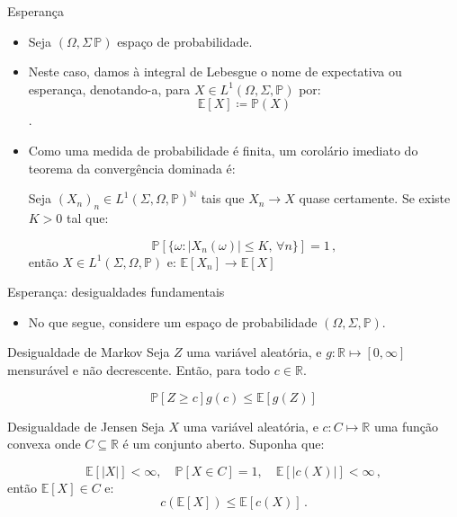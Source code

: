 \documentclass[11pt]{beamer}
\begin{document}
	\begin{frame}{Esperança}
	\begin{itemize}
		\item Seja $(\Omega, \Sigma\,\mathbb{P})$ espaço de probabilidade.
		\item Neste caso, damos à integral de Lebesgue o nome de expectativa ou esperança, denotando-a, para $X \in L^1(\Omega,\Sigma, \mathbb{P})$ por:
		$$\mathbb{E}[X] \coloneqq \mathbb{P}(X)$$.
		\item Como uma medida de probabilidade é finita, um corolário imediato do teorema da convergência dominada é:
		\begin{corollary}
			Seja $(X_n)_n \in L^1(\Sigma, \Omega,\mathbb{P})^{\mathbb{N}}$ tais que $X_n \to X$ quase certamente. Se existe $K>0$ tal que:
			
			$$\mathbb{P}[\{\omega:|X_n(\omega)|\leq K,\,  \forall n\}] = 1\, ,$$
			então $X \in L^1(\Sigma, \Omega,\mathbb{P})$ e:
			$\mathbb{E}[X_n] \to \mathbb{E}[X]$
		\end{corollary}
	\end{itemize}
	\end{frame}
	
	\begin{frame}{Esperança: desigualdades fundamentais}
		\begin{itemize}
			\item No que segue, considere um espaço de probabilidade $(\Omega,\Sigma, \mathbb{P})$.
		\end{itemize}
		\begin{lemma}{Desigualdade de Markov}
			Seja $Z$ uma variável aleatória, e $g: \mathbb{R} \mapsto [0,\infty]$ mensurável e não decrescente.  Então, para todo $c \in \mathbb{R}$.
			
			$$\mathbb{P}[Z\geq c] g(c) \leq \mathbb{E}[g(Z)]$$
		\end{lemma}
		
			\begin{lemma}{Desigualdade de Jensen}
		Seja $X$ uma variável aleatória, e $c: C \mapsto \mathbb{R}$ uma função convexa onde $C \subseteq \mathbb{R}$ é um conjunto aberto. Suponha que:
		
		$$\mathbb{E}[|X|]< \infty, \quad \mathbb{P}[X \in C]  = 1, \quad \mathbb{E}[|c(X)|]<\infty\, ,$$
		então $\mathbb{E}[X] \in C$ e:
		$$c(\mathbb{E}[X])\leq \mathbb{E}[c(X)]\, .$$
		\end{lemma}
	\end{frame}
	
\end{document}

